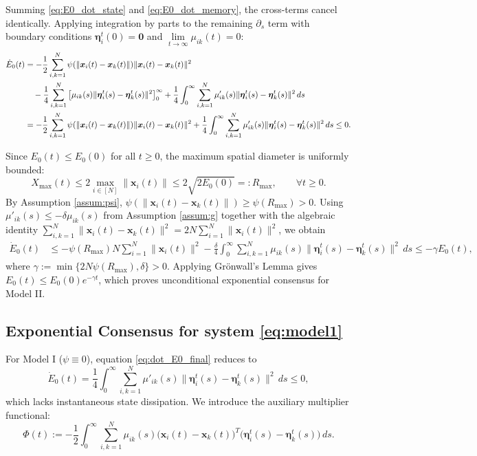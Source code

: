 \documentclass[11pt]{amsart}
\numberwithin{equation}{section}
\begin{document}
Summing \eqref{eq:E0_dot_state} and \eqref{eq:E0_dot_memory}, the cross-terms cancel identically. Applying integration by parts to the remaining $\partial_s$ term with boundary conditions $\boldsymbol{\eta}_i^t(0)=\mathbf{0}$ and $\lim\limits_{t\rightarrow\infty}\mu_{ik}(t)=0$:
{\small
\begin{align}\label{eq:dot_E0_final}
\dot{E}_0(t) &= -\frac{1}{2}\sum_{i,k=1}^N \psi(\|\boldsymbol{x}_i(t)-\boldsymbol{x}_k(t)\|)\|\boldsymbol{x}_i(t)-\boldsymbol{x}_k(t)\|^2 \notag \\
&\quad - \frac{1}{4}\sum_{i,k=1}^N \left[ \mu_{ik}(s) \|\boldsymbol{\eta}_i^t(s) - \boldsymbol{\eta}_k^t(s)\|^2 \right]_0^\infty + \frac{1}{4}\int_0^\infty\sum_{i,k=1}^N \mu'_{ik}(s)\|\boldsymbol{\eta}_i^t(s)-\boldsymbol{\eta}_k^t(s)\|^2\,ds \notag \\
&= -\frac{1}{2}\sum_{i,k=1}^N \psi(\|\boldsymbol{x}_i(t)-\boldsymbol{x}_k(t)\|)\|\boldsymbol{x}_i(t)-\boldsymbol{x}_k(t)\|^2 + \frac{1}{4}\int_0^\infty\sum_{i,k=1}^N \mu'_{ik}(s)\|\boldsymbol{\eta}_i^t(s)-\boldsymbol{\eta}_k^t(s)\|^2\,ds \le 0.
\end{align}
}

Since $E_0(t) \le E_0(0)$ for all $t \ge 0$, the maximum spatial diameter is uniformly bounded:
\begin{equation*}
X_{\max}(t) \le 2 \max_{i\in[N]} \|\boldsymbol{x}_i(t)\| \le 2\sqrt{2E_0(0)} =: R_{\max}, \qquad \forall t \ge 0.
\end{equation*}
By Assumption \ref{assum:psi}, $\psi(\|\boldsymbol{x}_i(t)-\boldsymbol{x}_k(t)\|) \ge \psi(R_{\max}) > 0$. Using $\mu'_{ik}(s) \le -\delta \mu_{ik}(s)$ from Assumption \ref{assum:g} together with the algebraic identity $\sum\limits_{i,k=1}^N \|\boldsymbol{x}_i(t)-\boldsymbol{x}_k(t)\|^2 = 2N \sum\limits_{i=1}^N \|\boldsymbol{x}_i(t)\|^2$, we obtain
\begin{align*}
\dot{E}_0(t) &\le -\psi(R_{\max}) N \sum_{i=1}^N\|\boldsymbol{x}_i(t)\|^2 - \frac{\delta}{4}\int_0^\infty\sum_{i,k=1}^N \mu_{ik}(s)\|\boldsymbol{\eta}_i^t(s)-\boldsymbol{\eta}_k^t(s)\|^2\,ds \le -\gamma E_0(t),
\end{align*}
where $\gamma := \min\{2N\psi(R_{\max}), \delta\} > 0$. Applying Gr\"onwall's Lemma gives $E_0(t) \le E_0(0)e^{-\gamma t}$, which proves unconditional exponential consensus for Model II.




\subsection{Exponential Consensus for system \eqref{eq:model1}} For Model I ($\psi \equiv 0$), equation \eqref{eq:dot_E0_final} reduces to
$$
\dot{E}_0(t) = \frac{1}{4}\int_0^\infty\sum_{i,k=1}^N \mu'_{ik}(s)\|\boldsymbol{\eta}_i^t(s)-\boldsymbol{\eta}_k^t(s)\|^2\,ds \le 0,
$$
which lacks instantaneous state dissipation. We introduce the auxiliary multiplier functional:
\begin{equation}\label{eq:multiplier_M1}
\Phi(t) := -\frac{1}{2}\int_0^\infty\sum_{i,k=1}^N\mu_{ik}(s)\big(\boldsymbol{x}_i(t)-\boldsymbol{x}_k(t)\big)^T\big(\boldsymbol{\eta}_i^t(s)-\boldsymbol{\eta}_k^t(s)\big)\,ds.
\end{equation}
\end{document}
